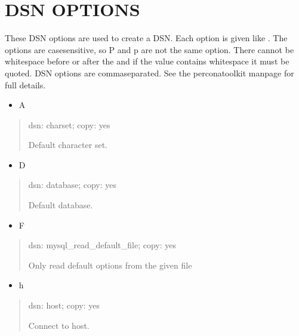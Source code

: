 \documentclass[letterpaper,10pt,english]{sphinxmanual}
\begin{document}
\section{DSN OPTIONS}
\label{\detokenize{mariadb-kill:dsn-options}}
\sphinxAtStartPar
These DSN options are used to create a DSN.  Each option is given like
.  The options are case\sphinxhyphen{}sensitive, so P and p are not the
same option.  There cannot be whitespace before or after the \sphinxcode{\sphinxupquote{=}} and
if the value contains whitespace it must be quoted.  DSN options are
comma\sphinxhyphen{}separated.  See the percona\sphinxhyphen{}toolkit manpage for full details.
\begin{itemize}
\item {} 
\sphinxAtStartPar
A

\end{itemize}
\begin{quote}

\sphinxAtStartPar
dsn: charset; copy: yes

\sphinxAtStartPar
Default character set.
\end{quote}
\begin{itemize}
\item {} 
\sphinxAtStartPar
D

\end{itemize}
\begin{quote}

\sphinxAtStartPar
dsn: database; copy: yes

\sphinxAtStartPar
Default database.
\end{quote}
\begin{itemize}
\item {} 
\sphinxAtStartPar
F

\end{itemize}
\begin{quote}

\sphinxAtStartPar
dsn: mysql\_read\_default\_file; copy: yes

\sphinxAtStartPar
Only read default options from the given file
\end{quote}
\begin{itemize}
\item {} 
\sphinxAtStartPar
h

\end{itemize}
\begin{quote}

\sphinxAtStartPar
dsn: host; copy: yes

\sphinxAtStartPar
Connect to host.
\end{quote}
\end{document}
